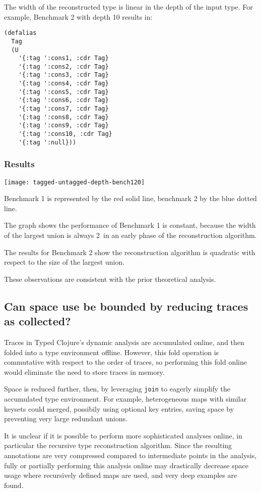 The width of the reconstructed type is linear in the depth of the input type.
For example, Benchmark 2 with depth 10 results in:

\begin{verbatim}
(defalias
  Tag
  (U
    '{:tag ':cons1, :cdr Tag}
    '{:tag ':cons2, :cdr Tag}
    '{:tag ':cons3, :cdr Tag}
    '{:tag ':cons4, :cdr Tag}
    '{:tag ':cons5, :cdr Tag}
    '{:tag ':cons6, :cdr Tag}
    '{:tag ':cons7, :cdr Tag}
    '{:tag ':cons8, :cdr Tag}
    '{:tag ':cons9, :cdr Tag}
    '{:tag ':cons10, :cdr Tag}
    '{:tag ':null}))
\end{verbatim}

\subsubsection{Results}

\texttt{[image: tagged-untagged-depth-bench120]}

Benchmark 1 is represented by the red solid line, benchmark 2 by the
blue dotted line.

The graph shows the performance of Benchmark 1 is constant, because
the width of the largest union is always 2\ in an early phase of the reconstruction
algorithm.

The results for Benchmark 2 show the reconstruction algorithm is quadratic
with respect to the size of the largest union.

These observations are consistent with the prior theoretical analysis.

\subsection{Can space use be bounded by reducing traces as collected?}

Traces in Typed Clojure's dynamic analysis are accumulated online, and then
folded into a type environment offline. However, this fold operation is commutative
with respect to the order of traces, so performing this fold online would
eliminate the need to store traces in memory.

Space is reduced further, then, by leveraging \texttt{join} to eagerly simplify
the accumulated type environment. For example, heterogeneous maps with similar
keysets could merged, possibily using optional key entries, saving space by
preventing very large redundant unions.

It is unclear if it is possible to perform more sophisticated analyses online,
in particular the recursive type reconstruction algorithm. Since the resulting
annotations are very compressed compared to intermediate points in the analysis,
fully or partially performing this analysis online may drastically decrease space
usage where recursively defined maps are used, and very deep examples are found.

